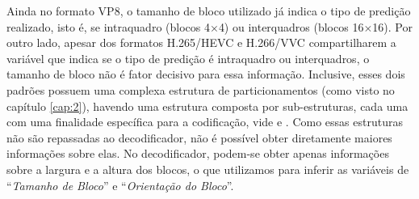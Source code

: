 Ainda no formato VP8, o tamanho de bloco utilizado já indica o tipo de predição realizado, isto é, se intraquadro (blocos 4$\times$4) ou interquadros (blocos 16$\times$16). Por outro lado, apesar dos formatos H.265/HEVC e H.266/VVC compartilharem a variável que indica se o tipo de predição é intraquadro ou interquadros, o tamanho de bloco não é fator decisivo para essa informação. Inclusive, esses dois padrões possuem uma complexa estrutura de particionamentos (como visto no capítulo \ref{cap:2}), havendo uma estrutura composta por sub-estruturas, cada uma com uma finalidade específica para a codificação, vide \citet{bib:h265} e \citet{bib:vvc_partitioningStructure}. Como essas estruturas não são repassadas ao decodificador, não é possível obter diretamente maiores informações sobre elas. No decodificador, podem-se obter apenas informações sobre a largura e a altura dos blocos, o que utilizamos para inferir as variáveis de ``\textit{Tamanho de Bloco}'' e ``\textit{Orientação do Bloco}''.
